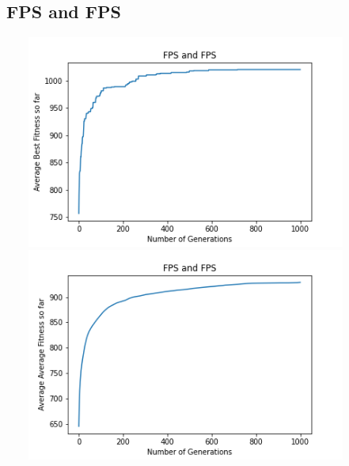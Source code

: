 \documentclass[a4paper]{article}
\begin{document}
\subsection{FPS and FPS}
\includegraphics[width=12cm, height=7cm]{Graphs/KnapSack/fps_fps_bsf.png} \\
\includegraphics[width=12cm, height=7cm]{Graphs/KnapSack/fps_fps_avg.png} \\
\end{document}
